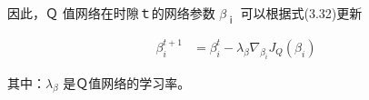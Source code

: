 因此，Ｑ 值网络在时隙ｔ的网络参数 \(β_ｉ\) 可以根据式(3.32)更新

\begin{align}
	\beta_{i}^{t+1} &= \beta_{i}^{t} - \lambda_{\beta} \nabla_{\beta_{i}} J_{Q}(\beta_{i})
\end{align}

其中：\(λ_β\) 是Ｑ值网络的学习率。































